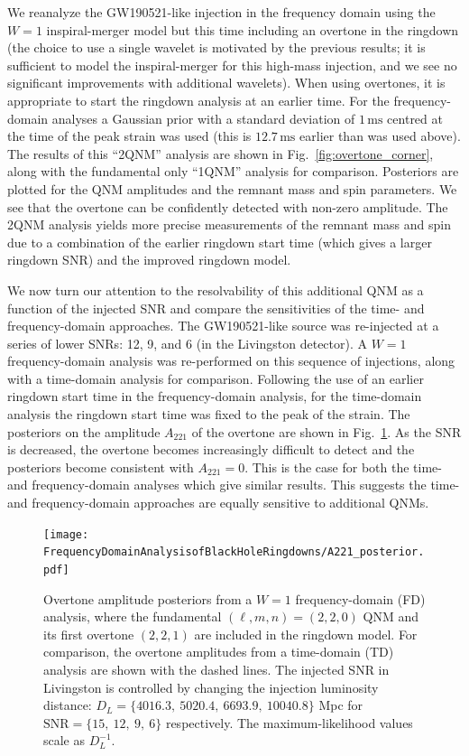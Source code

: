 We reanalyze the GW190521-like injection in the frequency domain using the $W=1$ inspiral-merger model but this time including an overtone in the ringdown (the choice to use a single wavelet is motivated by the previous results; it is sufficient to model the inspiral-merger for this high-mass injection, and we see no significant improvements with additional wavelets).
When using overtones, it is appropriate to start the ringdown analysis at an earlier time. 
For the frequency-domain analyses a Gaussian prior with a standard deviation of $1\,\mathrm{ms}$ centred at the time of the peak strain was used (this is $12.7\,\mathrm{ms}$ earlier than was used above).
The results of this ``2QNM'' analysis are shown in Fig.~\ref{fig:overtone_corner}, along with the fundamental only ``1QNM'' analysis for comparison.
Posteriors are plotted for the QNM amplitudes and the remnant mass and spin parameters. 
We see that the overtone can be confidently detected with non-zero amplitude.
The 2QNM analysis yields more precise measurements of the remnant mass and spin due to a combination of the earlier ringdown start time (which gives a larger ringdown SNR) and the improved ringdown model.

We now turn our attention to the resolvability of this additional QNM as a function of the injected SNR and compare the sensitivities of the time- and frequency-domain approaches.
The GW190521-like source was re-injected at a series of lower SNRs: 12, 9, and 6 (in the Livingston detector).
A $W=1$ frequency-domain analysis was re-performed on this sequence of injections, along with a time-domain analysis for comparison. 
Following the use of an earlier ringdown start time in the frequency-domain analysis, for the time-domain analysis the ringdown start time was fixed to the peak of the strain.
The posteriors on the amplitude $A_{221}$ of the overtone are shown in Fig.~\ref{fig:A221_posterior}.
As the SNR is decreased, the overtone becomes increasingly difficult to detect and the posteriors become consistent with $A_{221}=0$.
This is the case for both the time- and frequency-domain analyses which give similar results.
This suggests the time- and frequency-domain approaches are equally sensitive to additional QNMs.

\begin{figure}[t]
    \centering
    \texttt{[image: FrequencyDomainAnalysisofBlackHoleRingdowns/A221\_posterior.pdf]}
    \caption[Posteriors on the overtone amplitude for GW190521-like injections at a selection of signal-to-noise ratios, for both time- and frequency-domain analyses]{ 
    Overtone amplitude posteriors from a $W=1$ frequency-domain (FD) analysis, where the fundamental $(\ell,m,n) = (2,2,0)$ QNM and its first overtone $(2,2,1)$ are included in the ringdown model. 
    For comparison, the overtone amplitudes from a time-domain (TD) analysis are shown with the dashed lines. 
    The injected SNR in Livingston is controlled by changing the injection luminosity distance: $D_L = \{4016.3,\ 5020.4,\ 6693.9,\ 10040.8\}$ Mpc for $\mathrm{SNR} = \{15,\ 12,\ 9,\ 6\}$ respectively. 
    The maximum-likelihood values scale as $D_L^{-1}$.
    }
    \label{fig:A221_posterior}
\end{figure}

